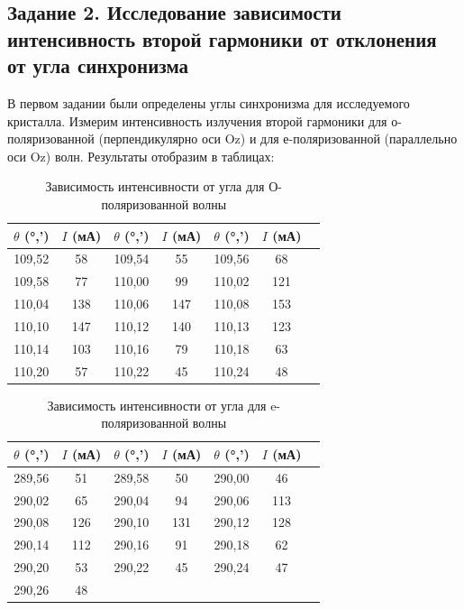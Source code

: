 \documentclass[12pt,a5paper,titlepage, main = russian]{article}
\begin{document}
\subsection{Задание 2. Исследование зависимости интенсивность второй гармоники от отклонения от угла синхронизма}
В первом задании были определены углы синхронизма для исследуемого кристалла.
Измерим интенсивность излучения второй гармоники для о-поляризованной (перпендикулярно оси Oz) и для е-поляризованной (параллельно оси Oz) волн.
Результаты отобразим в таблицах:
\begin{table}[H]
    \centering
    \label{tab:o_wave}
    \footnotesize
    \begin{tabular}{|c|c|c|c|c|c|c|}
        \hline
        $\theta$ (°,') & $I$ (мА) & $\theta$ (°,') & $I$ (мА) & $\theta$ (°,') & $I$ (мА) \\
        \hline
        109,52 & 58 & 109,54 & 55 & 109,56 & 68 \\
        109,58 & 77 & 110,00 & 99 & 110,02 & 121 \\
        110,04 & 138 & 110,06 & 147 & 110,08 & 153 \\
        110,10 & 147 & 110,12 & 140 & 110,13 & 123 \\
        110,14 & 103 & 110,16 & 79 & 110,18 & 63 \\
        110,20 & 57 & 110,22 & 45 & 110,24 & 48 \\
        \hline
    \end{tabular}
    \caption{Зависимость интенсивности от угла для О-поляризованной волны}
\end{table}

\vspace{0.2cm}

\begin{table}[H]
    \centering
    \label{tab:e_wave}
    \footnotesize
    \begin{tabular}{|c|c|c|c|c|c|c|}
        \hline
        $\theta$ (°,') & $I$ (мА) & $\theta$ (°,') & $I$ (мА) & $\theta$ (°,') & $I$ (мА) \\
        \hline
        289,56 & 51 & 289,58 & 50 & 290,00 & 46 \\
        290,02 & 65 & 290,04 & 94 & 290,06 & 113 \\
        290,08 & 126 & 290,10 & 131 & 290,12 & 128 \\
        290,14 & 112 & 290,16 & 91 & 290,18 & 62 \\
        290,20 & 53 & 290,22 & 45 & 290,24 & 47 \\
        290,26 & 48 & & & & \\
        \hline
    \end{tabular}
    \caption{Зависимость интенсивности от угла для e-поляризованной волны}
\end{table}
\end{document}
